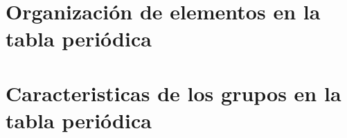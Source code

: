 


\section{Organización de elementos en la tabla periódica}



\section{Caracteristicas de los grupos en la tabla periódica}





\putbib